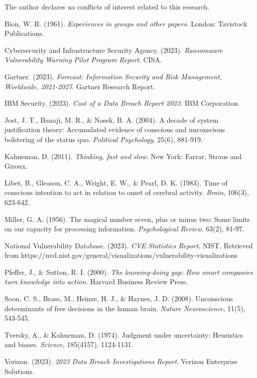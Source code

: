 \documentclass[10pt, twocolumn]{article}
\begin{document}
The author declares no conflicts of interest related to this research.

\begin{thebibliography}{99}

Bion, W. R. (1961). \textit{Experiences in groups and other papers}. London: Tavistock Publications.

Cybersecurity and Infrastructure Security Agency. (2023). \textit{Ransomware Vulnerability Warning Pilot Program Report}. CISA.

Gartner. (2023). \textit{Forecast: Information Security and Risk Management, Worldwide, 2021-2027}. Gartner Research Report.

IBM Security. (2023). \textit{Cost of a Data Breach Report 2023}. IBM Corporation.

Jost, J. T., Banaji, M. R., \& Nosek, B. A. (2004). A decade of system justification theory: Accumulated evidence of conscious and unconscious bolstering of the status quo. \textit{Political Psychology}, 25(6), 881-919.

Kahneman, D. (2011). \textit{Thinking, fast and slow}. New York: Farrar, Straus and Giroux.

Libet, B., Gleason, C. A., Wright, E. W., \& Pearl, D. K. (1983). Time of conscious intention to act in relation to onset of cerebral activity. \textit{Brain}, 106(3), 623-642.

Miller, G. A. (1956). The magical number seven, plus or minus two: Some limits on our capacity for processing information. \textit{Psychological Review}, 63(2), 81-97.

National Vulnerability Database. (2023). \textit{CVE Statistics Report}. NIST. Retrieved from https://nvd.nist.gov/general/visualizations/vulnerability-visualizations

Pfeffer, J., \& Sutton, R. I. (2000). \textit{The knowing-doing gap: How smart companies turn knowledge into action}. Harvard Business Review Press.

Soon, C. S., Brass, M., Heinze, H. J., \& Haynes, J. D. (2008). Unconscious determinants of free decisions in the human brain. \textit{Nature Neuroscience}, 11(5), 543-545.

Tversky, A., \& Kahneman, D. (1974). Judgment under uncertainty: Heuristics and biases. \textit{Science}, 185(4157), 1124-1131.

Verizon. (2023). \textit{2023 Data Breach Investigations Report}. Verizon Enterprise Solutions.

\end{thebibliography}
\end{document}
